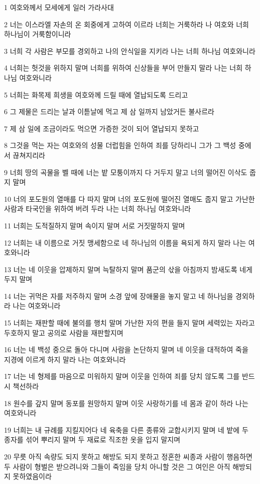 \par 1 여호와께서 모세에게 일러 가라사대
\par 2 너는 이스라엘 자손의 온 회중에게 고하여 이르라 너희는 거룩하라 나 여호와 너희 하나님이 거룩함이니라
\par 3 너희 각 사람은 부모를 경외하고 나의 안식일을 지키라 나는 너희 하나님 여호와니라
\par 4 너희는 헛것을 위하지 말며 너희를 위하여 신상들을 부어 만들지 말라 나는 너희 하나님 여호와니라
\par 5 너희는 화목제 희생을 여호와께 드릴 때에 열납되도록 드리고
\par 6 그 제물은 드리는 날과 이튿날에 먹고 제 삼 일까지 남았거든 불사르라
\par 7 제 삼 일에 조금이라도 먹으면 가증한 것이 되어 열납되지 못하고
\par 8 그것을 먹는 자는 여호와의 성물 더럽힘을 인하여 죄를 당하리니 그가 그 백성 중에서 끊쳐지리라
\par 9 너희 땅의 곡물을 벨 때에 너는 밭 모퉁이까지 다 거두지 말고 너의 떨어진 이삭도 줍지 말며
\par 10 너의 포도원의 열매를 다 따지 말며 너의 포도원에 떨어진 열매도 줍지 말고 가난한 사람과 타국인을 위하여 버려 두라 나는 너희 하나님 여호와니라
\par 11 너희는 도적질하지 말며 속이지 말며 서로 거짓말하지 말며
\par 12 너희는 내 이름으로 거짓 맹세함으로 네 하나님의 이름을 욕되게 하지 말라 나는 여호와니라
\par 13 너는 네 이웃을 압제하지 말며 늑탈하지 말며 품군의 삯을 아침까지 밤새도록 네게 두지 말며
\par 14 너는 귀먹은 자를 저주하지 말며 소경 앞에 장애물을 놓지 말고 네 하나님을 경외하라 나는 여호와니라
\par 15 너희는 재판할 때에 불의를 행치 말며 가난한 자의 편을 들지 말며 세력있는 자라고 두호하지 말고 공의로 사람을 재판할지며
\par 16 너는 네 백성 중으로 돌아 다니며 사람을 논단하지 말며 네 이웃을 대적하여 죽을 지경에 이르게 하지 말라 나는 여호와니라
\par 17 너는 네 형제를 마음으로 미워하지 말며 이웃을 인하여 죄를 당치 않도록 그를 반드시 책선하라
\par 18 원수를 갚지 말며 동포를 원망하지 말며 이웃 사랑하기를 네 몸과 같이 하라 나는 여호와니라
\par 19 너희는 내 규례를 지킬지어다 네 육축을 다른 종류와 교합시키지 말며 네 밭에 두 종자를 섞어 뿌리지 말며 두 재료로 직조한 옷을 입지 말지며
\par 20 무릇 아직 속량도 되지 못하고 해방도 되지 못하고 정혼한 씨종과 사람이 행음하면 두 사람이 형벌은 받으려니와 그들이 죽임을 당치 아니할 것은 그 여인은 아직 해방되지 못하였음이라
